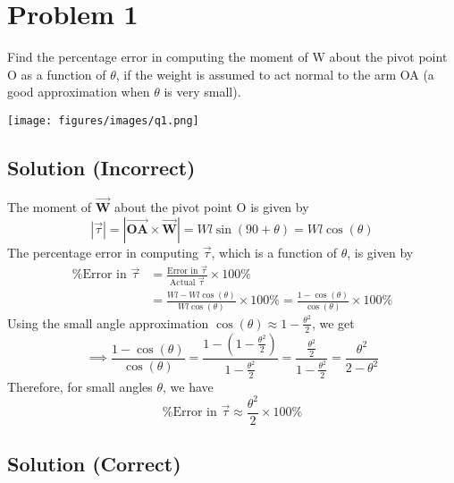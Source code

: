 \section*{Problem 1}

Find the percentage error in computing the moment of W about the pivot point O as a function of \( \theta \), if the weight is assumed to act normal to the arm OA (a good approximation when \( \theta \) is very small).

\begin{figure*}[h]
    \centering
    \texttt{[image: figures/images/q1.png]}
\end{figure*}

\subsection*{Solution (Incorrect)}

The moment of \( \vec{\mathbf{W}} \) about the pivot point O is given by
\[
    |\vec{\tau}| = |\vec{\mathbf{OA}} \times \vec{\mathbf{W}}|
    = W l \sin(90 + \theta)
    = W l \cos(\theta)
\]
The percentage error in computing \( \vec{\tau} \), which is a function of \( \theta \),  is given by
\begin{align*}
    \text{\%Error in } \vec{\tau}
     & =
    \frac{\text{Error in }\vec{\tau}}{\text{Actual }\vec{\tau}} \times 100\% \\
     & = \frac{W l - W l \cos(\theta)}{W l \cos(\theta)} \times 100\%
    = \frac{1 - \cos(\theta)}{\cos(\theta)} \times 100\%
\end{align*}
Using the small angle approximation \( \cos(\theta) \approx 1 - \frac{\theta^2}{2} \), we get
\[
    \implies \frac{1 - \cos(\theta)}{\cos(\theta)}
    = \frac{1 - (1 - \frac{\theta^2}{2})}{1 - \frac{\theta^2}{2}}
    = \frac{\frac{\theta^2}{2}}{1 - \frac{\theta^2}{2}}
    = \frac{\theta^2}{2 - \theta^2}
\]
Therefore, for small angles \( \theta \), we have
\[
    \boxed{
        \text{\%Error in } \vec{\tau} \approx \frac{\theta^2}{2} \times 100\%
    }
\]

\subsection*{Solution (Correct)}

